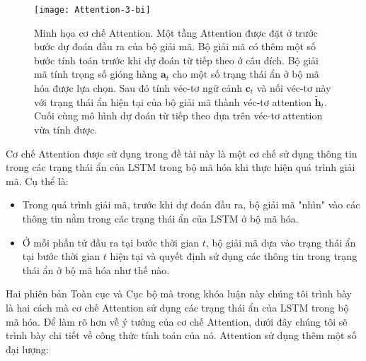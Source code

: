 \begin{figure}
	\centering
	\texttt{[image: Attention-3-bi]}
	\caption[Minh họa cơ chế Attention.]{Minh họa cơ chế Attention. Một tầng Attention được đặt ở trước bước dự đoán đầu ra của bộ giải mã. Bộ giải mã có thêm một số bước tính toán trước khi dự đoán từ tiếp theo ở câu đích. Bộ giải mã tính trọng số gióng hàng $\bm{a}_t$ cho một số trạng thái ẩn ở bộ mã hóa được lựa chọn. Sau đó tính véc-tơ ngữ cảnh $\bm{c}_t$ và nối véc-tơ này với trạng thái ẩn hiện tại của bộ giải mã thành véc-tơ attention $\bm{\tilde{h}}_t$. Cuối cùng mô hình dự đoán từ tiếp theo dựa trên véc-tơ attention vừa tính được.}
	\label{fig_Attention}
\end{figure}
Cơ chế Attention được sử dụng trong đề tài này là một cơ chế sử dụng thông tin trong các trạng thái ẩn của LSTM trong bộ mã hóa khi thực hiện quá trình giải mã. Cụ thể là:
\begin{itemize}
	\item Trong quá trình giải mã, trước khi dự đoán đầu ra, bộ giải mã "nhìn" vào các thông tin nằm trong các trạng thái ẩn của LSTM ở bộ mã hóa.
	\item Ở mỗi phần tử đầu ra tại bước thời gian $t$, bộ giải mã dựa vào trạng thái ẩn tại bước thời gian $t$ hiện tại và quyết định sử dụng các thông tin trong trạng thái ẩn ở bộ mã hóa như thế nào.
\end{itemize}
Hai phiên bản Toàn cục và Cục bộ mà trong khóa luận này chúng tôi trình bày là hai cách mà cơ chế Attention sử dụng các trạng thái ẩn của LSTM trong bộ mã hóa.
Để làm rõ hơn về ý tưởng của cơ chế Attention, dưới đây chúng tôi sẽ trình bày chi tiết về công thức tính toán của nó.
Attention sử dụng thêm một số đại lượng:
